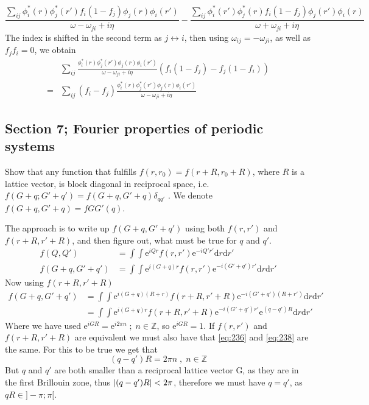 \begin{solution}
\begin{equation}
    \frac{\sum_{ij} \phi_i^*(r)\phi_j^*(r') f_i(1-f_j)  \phi_j(r) \phi_i(r') }{\omega - \omega_{ji} + i \eta} - \frac{\sum_{ij} \phi_i^*(r')\phi_j^*(r) f_i(1-f_j)  \phi_j(r') \phi_i(r) }{\omega + \omega_{ji} + i \eta}
\end{equation}
The index is shifted in the second term as $j \leftrightarrow i$, then using $\omega_{ij} = - \omega_{ji}$, as well as $f_jf_i = 0$, we obtain
\begin{equation}
\begin{split}
       &\sum_{ij} \frac{ \phi_i^*(r)\phi_j^*(r')  \phi_j(r) \phi_i(r') }{\omega - \omega_{ji} + i \eta}(f_i(1-f_j) - f_j(1-f_i)) \\
       = &\sum_{ij} (f_i-f_j)\frac{ \phi_i^*(r)\phi_j^*(r')   \phi_j(r) \phi_i(r') }{\omega - \omega_{ji} + i \eta}
\end{split}
\label{eq:234}
\end{equation}
\end{solution}

\subsection{Section 7; Fourier properties of periodic systems}
\begin{exercise}
Show that any function that fulfills $f(r, r_0) = f(r +R, r_0 +R)$, where $R$ is a lattice vector, is block diagonal in reciprocal space, i.e. $f(G + q;G' + q') = f(G + q,G' + q)\delta_{qq'}$ . We denote $f(G + q,G' + q) = fGG'(q)$.
\end{exercise}
\begin{solution}
The approach is to write up $f(G+q,G'+q')$ using both $f(r,r')$ and $f(r+R,r'+R)$, and then figure out, what must be true for $q$ and $q'$.
\begin{align}
    f(Q,Q') &= \int\int \mathrm{e}^{iQr}f(r,r')\mathrm{e}^{-iQ'r'}\mathrm{d}r\mathrm{d}r' \\
    f(G+q,G'+q') &= \int\int \mathrm{e}^{i(G+q)r}f(r,r')\mathrm{e}^{-i(G'+q')r'}\mathrm{d}r\mathrm{d}r'
    \label{eq:236}
\end{align}
Now using $f(r+R,r'+R)$
\begin{align}
    f(G+q,G'+q') &= \int \int \mathrm{e}^{i(G+q)(R+r)} f(r+R,r'+R) \mathrm{e}^{-i(G'+q')(R+r')} \mathrm{d}r\mathrm{d}r'\\
    &=\int \int \mathrm{e}^{i(G+q)r} f(r+R,r'+R) \mathrm{e}^{-i(G'+q')r'}\mathrm{e}^{(q-q')R} \mathrm{d}r\mathrm{d}r'
    \label{eq:238}
\end{align}
Where we have used $\mathrm{e}^{iGR} = \mathrm{e}^{i2\pi n} \; ; \; n \in \mathbb{Z}$, so $\mathrm{e}^{iGR} = 1$.
If $f(r,r')$ and $f(r+R,r'+R)$ are equivalent we must also have that \eqref{eq:236} and \eqref{eq:238} are the same. For this to be true we get that
\begin{equation}
    (q-q')R = 2 \pi n \; , \; n \in \mathbb{Z}
\end{equation}
But $q$ and $q'$ are both smaller than a reciprocal lattice vector G, as they are in the first Brillouin zone, thus $\abs{(q-q')R} < 2 \pi$, therefore we must have $q=q'$, as $qR \in ]-\pi;\pi[$.
\end{solution}

